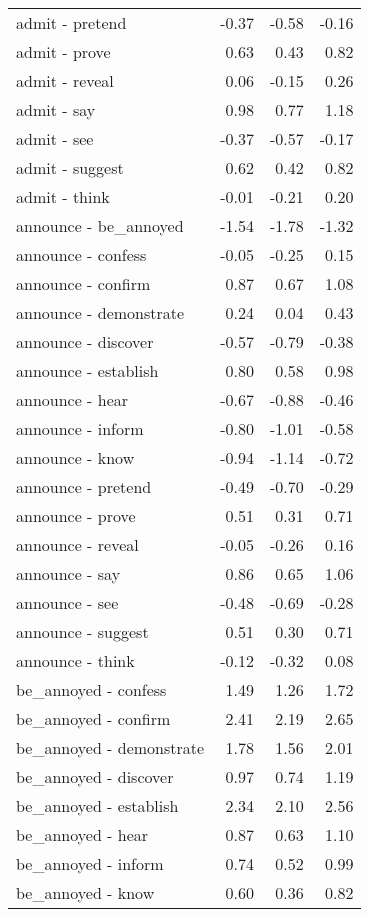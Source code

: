 \begin{longtable}{lrrr}
  admit - pretend & -0.37 & -0.58 & -0.16 \\ 
  admit - prove & 0.63 & 0.43 & 0.82 \\ 
  admit - reveal & 0.06 & -0.15 & 0.26 \\ 
  admit - say & 0.98 & 0.77 & 1.18 \\ 
  admit - see & -0.37 & -0.57 & -0.17 \\ 
  admit - suggest & 0.62 & 0.42 & 0.82 \\ 
  admit - think & -0.01 & -0.21 & 0.20 \\ 
  announce - be_annoyed & -1.54 & -1.78 & -1.32 \\ 
  announce - confess & -0.05 & -0.25 & 0.15 \\ 
  announce - confirm & 0.87 & 0.67 & 1.08 \\ 
  announce - demonstrate & 0.24 & 0.04 & 0.43 \\ 
  announce - discover & -0.57 & -0.79 & -0.38 \\ 
  announce - establish & 0.80 & 0.58 & 0.98 \\ 
  announce - hear & -0.67 & -0.88 & -0.46 \\ 
  announce - inform & -0.80 & -1.01 & -0.58 \\ 
  announce - know & -0.94 & -1.14 & -0.72 \\ 
  announce - pretend & -0.49 & -0.70 & -0.29 \\ 
  announce - prove & 0.51 & 0.31 & 0.71 \\ 
  announce - reveal & -0.05 & -0.26 & 0.16 \\ 
  announce - say & 0.86 & 0.65 & 1.06 \\ 
  announce - see & -0.48 & -0.69 & -0.28 \\ 
  announce - suggest & 0.51 & 0.30 & 0.71 \\ 
  announce - think & -0.12 & -0.32 & 0.08 \\ 
  be_annoyed - confess & 1.49 & 1.26 & 1.72 \\ 
  be_annoyed - confirm & 2.41 & 2.19 & 2.65 \\ 
  be_annoyed - demonstrate & 1.78 & 1.56 & 2.01 \\ 
  be_annoyed - discover & 0.97 & 0.74 & 1.19 \\ 
  be_annoyed - establish & 2.34 & 2.10 & 2.56 \\ 
  be_annoyed - hear & 0.87 & 0.63 & 1.10 \\ 
  be_annoyed - inform & 0.74 & 0.52 & 0.99 \\ 
  be_annoyed - know & 0.60 & 0.36 & 0.82 \\ 

\end{longtable}
